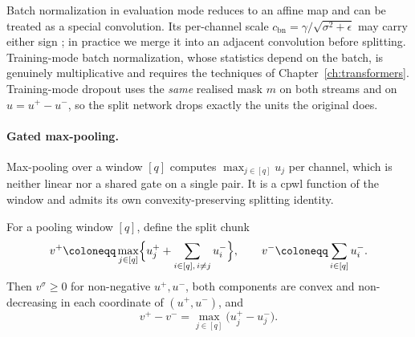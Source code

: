\begin{table}[htbp]
	\centering
	\caption[Linear CNN chunks]{Linear \ac{cnn} chunks as instances of Lemma~\ref{lem:linear_chunk}.}
	\label{tab:linear_chunks}
%
\end{table}

Batch normalization in evaluation mode reduces to an affine map and can be treated as a special convolution. Its per-channel scale $c_{\mathrm{bn}}=\gamma/\sqrt{\sigma^2+\epsilon}$ may carry either sign \parencite{Guillemot2020BreakingBN,Hui2019BNDecomposition}; in practice we merge it into an adjacent convolution before splitting. Training-mode batch normalization, whose statistics depend on the batch, is genuinely multiplicative and requires the techniques of Chapter~\ref{ch:transformers}. Training-mode dropout uses the \emph{same} realised mask $m$ on both streams and on $u = u^+ - u^-$, so the split network drops exactly the units the original does.

\paragraph{Gated max-pooling.}
Max-pooling over a window $[q]$ computes $\max_{j \in [q]} u_j$ per channel, which is neither linear nor a shared gate on a single pair. It is a \ac{cpwl} function of the window and admits its own convexity-preserving splitting identity.

\begin{proposition}\label{prop:maxpool_correct}
For a pooling window $[q]$, define the split chunk
\begin{equation}
	v^+ \coloneqq \max_{j \in [q]} \Bigl\{ u_j^+ + \sum_{i \in [q],\, i \neq j} u_i^- \Bigr\},
	\qquad
	v^- \coloneqq \sum_{i \in [q]} u_i^-.
	\label{eq:maxpool_split}
\end{equation}
Then $v^\sigma \ge 0$ for non-negative $u^+,u^-$, both components are convex and non-decreasing in each coordinate of $(u^+, u^-)$, and
\begin{equation}
	v^+ - v^- = \max_{j \in [q]} \bigl( u_j^+ - u_j^- \bigr).
	\label{eq:maxpool_identity}
\end{equation}\end{proposition}

